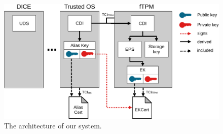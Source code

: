 \begin{figure}[htpb]
  \centering
  \includegraphics[width=1\linewidth]{figures/architecture.pdf}
  \caption{The architecture of our system.}\label{fig:architecture}
\end{figure}
